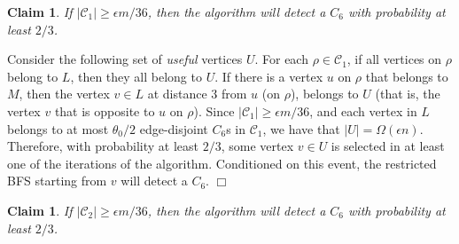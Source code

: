 \documentclass{article}
\newcommand{\eps}{\epsilon}
\newcommand{\calC}{{\mathcal{C}}}
\newenvironment{proof}{\smallskip\noindent{\bf Proof:}}%
        {\hspace*{\fill}$\Box$\par}
\newtheorem{claim}[lemma]{Claim}
\begin{document}
\begin{claim}\label{clm:C6-1}
If $|\calC_1| \geq \eps m/36$, then the algorithm will detect a $C_6$ with probability at least $2/3$.
\end{claim}

\begin{proof}
Consider the following set of \emph{useful} vertices $U$. For each $\rho\in \calC_1$, if all vertices on $\rho$ belong to $L$, then they all belong to $U$. If there is a vertex $u$ on $\rho$ that belongs to $M$, then the vertex $v\in L$ at distance $3$ from $u$ (on $\rho$), belongs to $U$ (that is, the vertex $v$  that is opposite to $u$ on $\rho$). Since $|\calC_1| \geq \eps m/36$, and each vertex in $L$ belongs to at most $\theta_0/2$ edge-disjoint $C_6$s in $\calC_1$, we have that $|U| = \Omega(\eps n)$. Therefore, with probability at least $2/3$, some vertex $v\in U$ is selected in at least one of the iterations of the algorithm. Conditioned on this event, the restricted BFS starting from $v$ will detect a $C_6$.
\end{proof}

\begin{claim}\label{clm:C6-2}
If $|\calC_2| \geq \eps m/36$, then the algorithm will detect a $C_6$ with probability at least $2/3$.
\end{claim}
\end{document}
